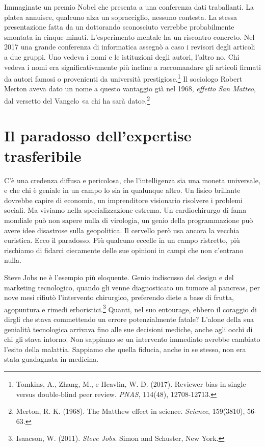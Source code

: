 Immaginate un premio Nobel che presenta a una conferenza dati traballanti. La platea annuisce, qualcuno alza un sopracciglio, nessuno contesta. La stessa presentazione fatta da un dottorando sconosciuto verrebbe probabilmente smontata in cinque minuti. L'esperimento mentale ha un riscontro concreto. Nel 2017 una grande conferenza di informatica assegnò a caso i revisori degli articoli a due gruppi. Uno vedeva i nomi e le istituzioni degli autori, l'altro no. Chi vedeva i nomi era significativamente più incline a raccomandare gli articoli firmati da autori famosi o provenienti da università prestigiose.\footnote{Tomkins, A., Zhang, M., e Heavlin, W. D. (2017). Reviewer bias in single- versus double-blind peer review. \textit{PNAS}, 114(48), 12708-12713.} Il sociologo Robert Merton aveva dato un nome a questo vantaggio già nel 1968, \textit{effetto San Matteo}, dal versetto del Vangelo «a chi ha sarà dato».\footnote{Merton, R. K. (1968). The Matthew effect in science. \textit{Science}, 159(3810), 56-63.}

\section{Il paradosso dell'expertise trasferibile}

C'\`{e} una credenza diffusa e pericolosa, che l'intelligenza sia una moneta universale, e che chi \`{e} geniale in un campo lo sia in qualunque altro. Un fisico brillante dovrebbe capire di economia, un imprenditore visionario risolvere i problemi sociali. Ma viviamo nella specializzazione estrema. Un cardiochirurgo di fama mondiale pu\`{o} non sapere nulla di virologia, un genio della programmazione pu\`{o} avere idee disastrose sulla geopolitica. Il cervello per\`{o} usa ancora la vecchia euristica. Ecco il paradosso. Pi\`{u} qualcuno eccelle in un campo ristretto, pi\`{u} rischiamo di fidarci ciecamente delle sue opinioni in campi che non c'entrano nulla.

Steve Jobs ne \`{e} l'esempio pi\`{u} eloquente. Genio indiscusso del design e del marketing tecnologico, quando gli venne diagnosticato un tumore al pancreas, per nove mesi rifiut\`{o} l'intervento chirurgico, preferendo diete a base di frutta, agopuntura e rimedi erboristici.\footnote{Isaacson, W. (2011). \textit{Steve Jobs}. Simon and Schuster, New York.} Quanti, nel suo entourage, ebbero il coraggio di dirgli che stava commettendo un errore potenzialmente fatale? L'alone della sua genialit\`{a} tecnologica arrivava fino alle sue decisioni mediche, anche agli occhi di chi gli stava intorno. Non sappiamo se un intervento immediato avrebbe cambiato l'esito della malattia. Sappiamo che quella fiducia, anche in se stesso, non era stata guadagnata in medicina.

